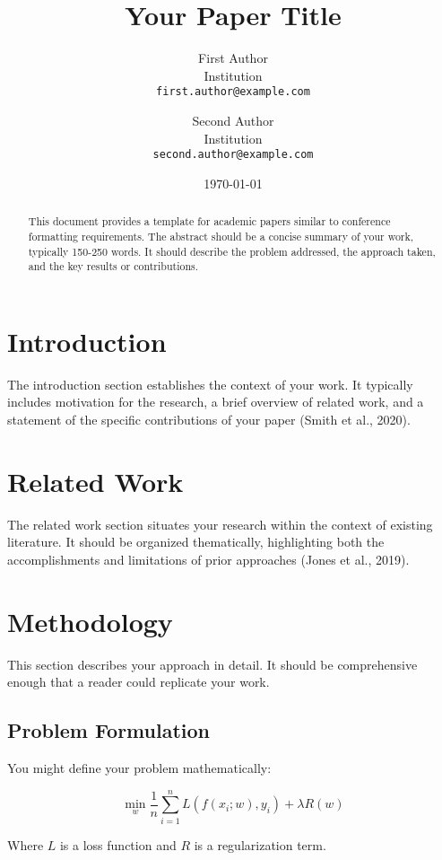\documentclass[10pt,a4paper,twocolumn]{article}
\title{Your Paper Title}
\author{
  First Author\\
  Institution\\
  \texttt{first.author@example.com}
  \and
  Second Author\\
  Institution\\
  \texttt{second.author@example.com}
}
\date{\today}
\begin{document}
\maketitle

\begin{abstract}
This document provides a template for academic papers similar to conference formatting requirements. The abstract should be a concise summary of your work, typically 150-250 words. It should describe the problem addressed, the approach taken, and the key results or contributions.
\end{abstract}

\section{Introduction}
\label{sec:introduction}

The introduction section establishes the context of your work. It typically includes motivation for the research, a brief overview of related work, and a statement of the specific contributions of your paper (Smith et al., 2020).

\section{Related Work}
\label{sec:related}

The related work section situates your research within the context of existing literature. It should be organized thematically, highlighting both the accomplishments and limitations of prior approaches (Jones et al., 2019).

\section{Methodology}
\label{sec:method}

This section describes your approach in detail. It should be comprehensive enough that a reader could replicate your work.

\subsection{Problem Formulation}
You might define your problem mathematically:

\begin{equation}
\min_{w} \frac{1}{n} \sum_{i=1}^{n} L(f(x_i; w), y_i) + \lambda R(w)
\end{equation}

Where $L$ is a loss function and $R$ is a regularization term.
\end{document}
